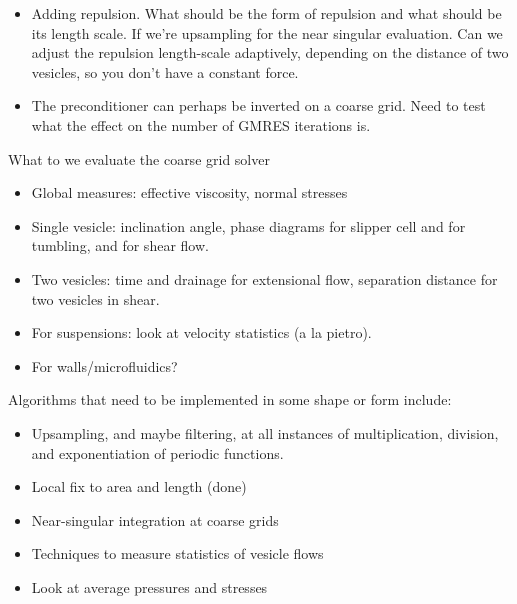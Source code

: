 \begin{itemize}
  \item Adding repulsion. What should be the form of repulsion and what
  should be its length scale. If we're upsampling for the near singular
  evaluation. Can we adjust the repulsion length-scale adaptively,
  depending on the distance of two vesicles, so you don't have a
  constant force. 

  \item The preconditioner can perhaps be inverted on a coarse grid.
  Need to test what the effect on the number of GMRES iterations is.
   

\end{itemize}

What to we evaluate the coarse grid solver
\begin{itemize}
  \item Global measures: effective viscosity, normal stresses
  \item Single vesicle: inclination angle, phase diagrams for slipper
    cell and for tumbling, and for shear flow. 
  \item Two vesicles: time and drainage for extensional flow,
    separation distance for two vesicles in shear. 
  \item For suspensions: look at velocity statistics (a la pietro). 
  \item For walls/microfluidics?
\end{itemize}

Algorithms that need to be implemented in some shape or form include:
\begin{itemize}
  \item Upsampling, and maybe filtering, at all instances of
  multiplication, division, and exponentiation of periodic functions.
  \item Local fix to area and length (done)
  \item Near-singular integration at coarse grids
  \item Techniques to measure statistics of vesicle flows
  \item Look at average pressures and stresses
\end{itemize}


